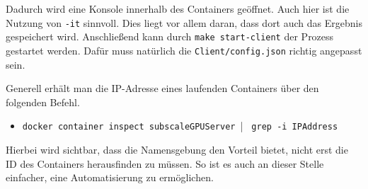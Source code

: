 Dadurch wird eine Konsole innerhalb des Containers geöffnet. Auch hier ist die Nutzung von \verb|-it| sinnvoll. Dies liegt vor allem daran, dass dort auch das Ergebnis gespeichert wird. Anschließend kann durch \verb|make start-client| der Prozess gestartet werden. Dafür muss natürlich die \verb|Client/config.json| richtig angepasst sein.

Generell erhält man die IP-Adresse eines laufenden Containers über den folgenden Befehl.

\begin{itemize}
    \item[] \verb|docker container inspect subscaleGPUServer || \verb| grep -i IPAddress|
\end{itemize}

Hierbei wird sichtbar, dass die Namensgebung den Vorteil bietet, nicht erst die ID des Containers herausfinden zu müssen. So ist es auch an dieser Stelle einfacher, eine Automatisierung zu ermöglichen.